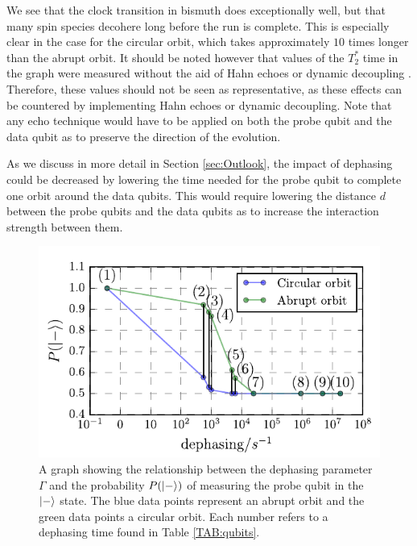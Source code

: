 We see that the clock transition in bismuth does exceptionally well, but that many spin species decohere long before the run is complete. This is especially clear in the case for the circular orbit, which takes approximately $10$ times longer than the abrupt orbit. It should be noted however that values of the  $T_2^*$ time in the graph were measured without the aid of Hahn echoes \cite{hahn} or dynamic decoupling \cite{something}. Therefore, these values should not be seen as representative, as these effects can be countered by implementing Hahn echoes or dynamic decoupling. Note that any echo technique would have to be applied on both the probe qubit and the data qubit as to preserve the direction of the evolution. 

As we discuss in more detail in Section \ref{sec:Outlook}, the impact of dephasing could be decreased by lowering the time needed for the probe qubit to complete one orbit around the data qubits. This would require lowering the distance $d$ between the probe qubits and the data qubits as to increase the interaction strength between them. 












\begin{figure}[h]
	\centering
	\includegraphics[width=1.05\linewidth]{../Figures/dephasing.pdf}
		\caption{A graph showing the relationship between the dephasing parameter $\Gamma$ and the probability $P(\ket{-})$ of measuring the probe qubit in the $\ket{-}$ state.  The blue data points represent an abrupt orbit and the green data points a circular orbit. Each number refers to a dephasing time found in Table \ref{TAB:qubits}. }
		\label{fig:dephasingplot}
\end{figure}





